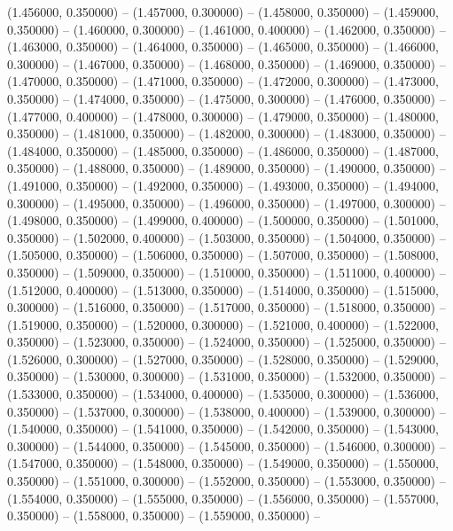 (1.456000, 0.350000) -- 
(1.457000, 0.300000) -- 
(1.458000, 0.350000) -- 
(1.459000, 0.350000) -- 
(1.460000, 0.300000) -- 
(1.461000, 0.400000) -- 
(1.462000, 0.350000) -- 
(1.463000, 0.350000) -- 
(1.464000, 0.350000) -- 
(1.465000, 0.350000) -- 
(1.466000, 0.300000) -- 
(1.467000, 0.350000) -- 
(1.468000, 0.350000) -- 
(1.469000, 0.350000) -- 
(1.470000, 0.350000) -- 
(1.471000, 0.350000) -- 
(1.472000, 0.300000) -- 
(1.473000, 0.350000) -- 
(1.474000, 0.350000) -- 
(1.475000, 0.300000) -- 
(1.476000, 0.350000) -- 
(1.477000, 0.400000) -- 
(1.478000, 0.300000) -- 
(1.479000, 0.350000) -- 
(1.480000, 0.350000) -- 
(1.481000, 0.350000) -- 
(1.482000, 0.300000) -- 
(1.483000, 0.350000) -- 
(1.484000, 0.350000) -- 
(1.485000, 0.350000) -- 
(1.486000, 0.350000) -- 
(1.487000, 0.350000) -- 
(1.488000, 0.350000) -- 
(1.489000, 0.350000) -- 
(1.490000, 0.350000) -- 
(1.491000, 0.350000) -- 
(1.492000, 0.350000) -- 
(1.493000, 0.350000) -- 
(1.494000, 0.300000) -- 
(1.495000, 0.350000) -- 
(1.496000, 0.350000) -- 
(1.497000, 0.300000) -- 
(1.498000, 0.350000) -- 
(1.499000, 0.400000) -- 
(1.500000, 0.350000) -- 
(1.501000, 0.350000) -- 
(1.502000, 0.400000) -- 
(1.503000, 0.350000) -- 
(1.504000, 0.350000) -- 
(1.505000, 0.350000) -- 
(1.506000, 0.350000) -- 
(1.507000, 0.350000) -- 
(1.508000, 0.350000) -- 
(1.509000, 0.350000) -- 
(1.510000, 0.350000) -- 
(1.511000, 0.400000) -- 
(1.512000, 0.400000) -- 
(1.513000, 0.350000) -- 
(1.514000, 0.350000) -- 
(1.515000, 0.300000) -- 
(1.516000, 0.350000) -- 
(1.517000, 0.350000) -- 
(1.518000, 0.350000) -- 
(1.519000, 0.350000) -- 
(1.520000, 0.300000) -- 
(1.521000, 0.400000) -- 
(1.522000, 0.350000) -- 
(1.523000, 0.350000) -- 
(1.524000, 0.350000) -- 
(1.525000, 0.350000) -- 
(1.526000, 0.300000) -- 
(1.527000, 0.350000) -- 
(1.528000, 0.350000) -- 
(1.529000, 0.350000) -- 
(1.530000, 0.300000) -- 
(1.531000, 0.350000) -- 
(1.532000, 0.350000) -- 
(1.533000, 0.350000) -- 
(1.534000, 0.400000) -- 
(1.535000, 0.300000) -- 
(1.536000, 0.350000) -- 
(1.537000, 0.300000) -- 
(1.538000, 0.400000) -- 
(1.539000, 0.300000) -- 
(1.540000, 0.350000) -- 
(1.541000, 0.350000) -- 
(1.542000, 0.350000) -- 
(1.543000, 0.300000) -- 
(1.544000, 0.350000) -- 
(1.545000, 0.350000) -- 
(1.546000, 0.300000) -- 
(1.547000, 0.350000) -- 
(1.548000, 0.350000) -- 
(1.549000, 0.350000) -- 
(1.550000, 0.350000) -- 
(1.551000, 0.300000) -- 
(1.552000, 0.350000) -- 
(1.553000, 0.350000) -- 
(1.554000, 0.350000) -- 
(1.555000, 0.350000) -- 
(1.556000, 0.350000) -- 
(1.557000, 0.350000) -- 
(1.558000, 0.350000) -- 
(1.559000, 0.350000) -- 
